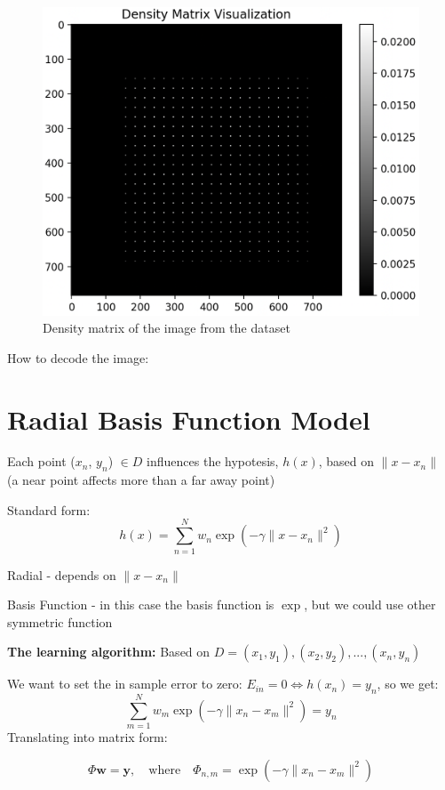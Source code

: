 \begin{figure}
    \centering
    \includegraphics[width=\linewidth]{figures/density_matrix_nmist_one.png}
    \caption{Density matrix of the image from the dataset}
    \label{fig:enter-label}
\end{figure}

How to decode the image:

\section{Radial Basis Function Model}
Each point ($x_n$, $y_n$) $\in D$ influences the hypotesis, $h(x)$, based on $\| x - x_n \|$ (a near point affects more than a far away point)

Standard form:
$$
h(x) = \sum_{n=1} ^N w_n\exp\left({-\gamma\| x - x_n \|^2}\right)
$$

Radial - depends on $\| x - x_n \|$

Basis Function - in this case the basis function is $\exp{}$, but we could use other symmetric function

\textbf{The learning algorithm:}
Based on $D = (x_1,y_1), (x_2, y_2),...,(x_n,y_n)$

We want to set the in sample error to zero: $E_{in} = 0 \iff h(x_n) = y_n$, so we get:
$$
\sum_{m = 1}^N w_m\exp{\left( -\gamma\|x_n - x_m \|^2\right)} = y_n
$$
Translating into matrix form:

\[
\Phi \mathbf{w} = \mathbf{y}, \quad \text{where} \quad \Phi_{n,m} = \exp\left( -\gamma\|x_n - x_m\|^2 \right)
\]

